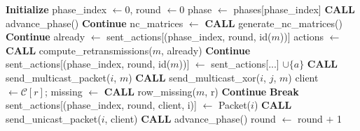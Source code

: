 \begin{algorithm}
	\caption{Main loop of the Retransmission Manager}
	\label{alg:retransmission-manager}
	\begin{algorithmic}[1]
		\State \textbf{Initialize} phase\_index $\gets 0$, round $\gets 0$
		\State phase $\gets$ phases[phase\_index]
		\State \textbf{CALL} advance\_phase()
		\State \textbf{Continue} 
		\EndIf
		\State nc\_matrices $\gets$ \textbf{CALL} generate\_nc\_matrices()
		 
		 \State \textbf{Continue} \EndIf
		\State already $\gets$ sent\_actions[(phase\_index, round, id($m$))]
		\State actions $\gets$ \textbf{CALL} compute\_retransmissions($m$, already)
		 \State \textbf{Continue} \EndIf
		\State sent\_actions[(phase\_index, round, id($m$))] $\gets$ sent\_actions[...] $\cup \{a\}$
		 \State \textbf{CALL} send\_multicast\_packet($i$, $m$) \EndIf
		 \State \textbf{CALL} send\_multicast\_xor($i$, $j$, $m$) \EndIf
		\EndFor
		\Else {}
		\State client $\gets \mathcal{C}[r]$; missing $\gets$ \textbf{CALL} row\_missing($m$, r)
		 \State \textbf{Continue} \EndIf
		 \State \textbf{Break} \EndIf
		\State sent\_actions[(phase\_index, round, client, i)] $\gets$ Packet($i$)
		\State \textbf{CALL} send\_unicast\_packet($i$, client)
		\EndFor
		\EndFor
		\EndIf
		\EndFor
		\State \textbf{CALL} advance\_phase()
		\State round $\gets$ round $+$ 1
		\EndWhile
	\end{algorithmic}
\end{algorithm}

